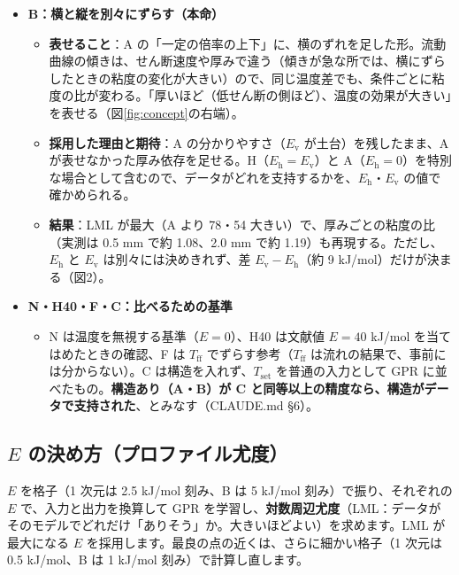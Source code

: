 \documentclass[paper=a4paper,fontsize=10.5pt,line_length=44zw,number_of_lines=38]{jlreq}
\newcommand{\Tff}{T_{\mathrm{ff}}}
\newcommand{\Tset}{T_{\mathrm{set}}}
\newcommand{\Eh}{E_{\mathrm{h}}}
\newcommand{\Ev}{E_{\mathrm{v}}}
\newenvironment{points}{\begin{itemize}[label=$\triangleright$,leftmargin=1.5\zw,itemsep=0.3ex,topsep=0.5ex,parsep=0pt]}{\end{itemize}}
\newcommand{\ptn}[1]{\item \textbf{#1}}
\begin{document}
\begin{points}
\begin{itemize}[leftmargin=1.5\zw,itemsep=0.2ex,topsep=0.2ex,parsep=0pt]
  \item \textbf{結果}：$\Eh$ が負（PP：$-$7.0, $-$4.5, $-$4.0、粉砕材混合 PP：$-$6.5, $-$4.5, $-$6.5 kJ/mol）に決まり、「低温ほど、同じ粘度になるせん断速度が大きい」ことになって、物理的に解釈しにくい。LML も A に劣る。
  \end{itemize}
\ptn{B：横と縦を別々にずらす（本命）}
  \begin{itemize}[leftmargin=1.5\zw,itemsep=0.2ex,topsep=0.2ex,parsep=0pt]
  \item \textbf{表せること}：A の「一定の倍率の上下」に、横のずれを足した形。流動曲線の傾きは、せん断速度や厚みで違う（傾きが急な所では、横にずらしたときの粘度の変化が大きい）ので、同じ温度差でも、条件ごとに粘度の比が変わる。「厚いほど（低せん断の側ほど）、温度の効果が大きい」を表せる（図\ref{fig:concept}の右端）。
  \item \textbf{採用した理由と期待}：A の分かりやすさ（$\Ev$ が土台）を残したまま、A が表せなかった厚み依存を足せる。H（$\Eh=\Ev$）と A（$\Eh=0$）を特別な場合として含むので、データがどれを支持するかを、$\Eh$・$\Ev$ の値で確かめられる。
  \item \textbf{結果}：LML が最大（A より 78・54 大きい）で、厚みごとの粘度の比（実測は 0.5 mm で約 1.08、2.0 mm で約 1.19）も再現する。ただし、$\Eh$ と $\Ev$ は別々には決めきれず、差 $\Ev-\Eh$（約 9 kJ/mol）だけが決まる（図2）。
  \end{itemize}
\ptn{N・H40・F・C：比べるための基準}
  \begin{itemize}[leftmargin=1.5\zw,itemsep=0.2ex,topsep=0.2ex,parsep=0pt]
  \item N は温度を無視する基準（$E=0$）、H40 は文献値 $E=40$ kJ/mol を当てはめたときの確認、F は $\Tff$ でずらす参考（$\Tff$ は流れの結果で、事前には分からない）。C は構造を入れず、$\Tset$ を普通の入力として GPR に並べたもの。\textbf{構造あり（A・B）が C と同等以上の精度なら、構造がデータで支持された}、とみなす（CLAUDE.md §6）。
  \end{itemize}
\end{points}

\subsection{$E$ の決め方（プロファイル尤度）}
$E$ を格子（1 次元は 2.5 kJ/mol 刻み、B は 5 kJ/mol 刻み）で振り、それぞれの $E$ で、入力と出力を換算して GPR を学習し、\textbf{対数周辺尤度}（LML：データがそのモデルでどれだけ「ありそう」か。大きいほどよい）を求めます。LML が最大になる $E$ を採用します。最良の点の近くは、さらに細かい格子（1 次元は 0.5 kJ/mol、B は 1 kJ/mol 刻み）で計算し直します。
\end{document}
